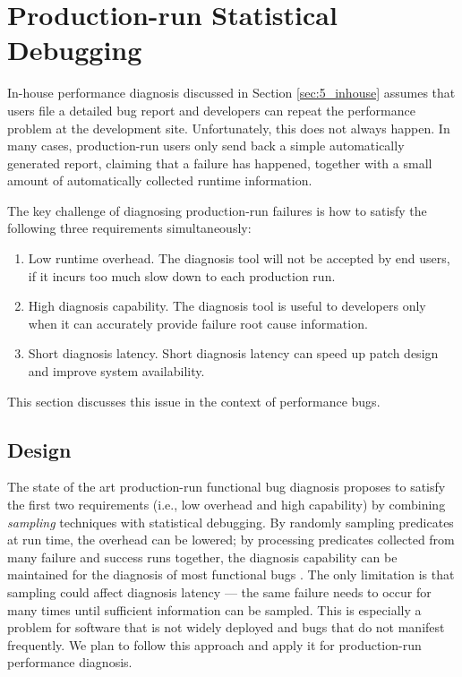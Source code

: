 \section{Production-run Statistical Debugging}
\label{sec:5_lbr}
In-house performance diagnosis discussed in Section \ref{sec:5_inhouse} assumes
that users file a detailed bug report and developers can repeat the 
performance problem at the development site. Unfortunately, this does not always
happen. In many cases, production-run users only send 
back a simple automatically generated report, claiming that a failure has 
happened, together with a small amount
of automatically collected runtime information. 

The key challenge of diagnosing production-run failures is how to satisfy the
following three requirements simultaneously:

\begin{enumerate}
\item Low runtime overhead. 
The diagnosis tool will not be accepted by end users, if it incurs too much
slow down to each production run.

\item High diagnosis capability. 
The diagnosis tool is useful to developers only when it can accurately 
provide failure root cause information.

\item Short diagnosis latency. 
Short diagnosis latency can speed up patch design and improve system
availability.
\end{enumerate}

This section discusses this issue
in the context of performance bugs.

\subsection{Design}
The state of the art production-run
functional bug diagnosis \citep{liblit03,liblit05,CCI,joy.asplos13} proposes
to satisfy the first two requirements (i.e., low overhead and high capability)
by combining  
\textit{sampling} techniques with
statistical debugging.
By randomly sampling predicates at run time, the overhead can be lowered;
by processing predicates collected from many failure and success runs
together, the diagnosis capability can be maintained for the diagnosis of most
functional bugs \citep{liblit03,liblit05,CCI,joy.asplos13}.
The only limitation is that sampling could affect diagnosis latency 
--- the same failure needs to occur for many times until sufficient information
can be sampled. This is especially a problem for software that is not widely
deployed and bugs that do not manifest frequently.
We plan to follow this approach and apply it for production-run performance
diagnosis.

